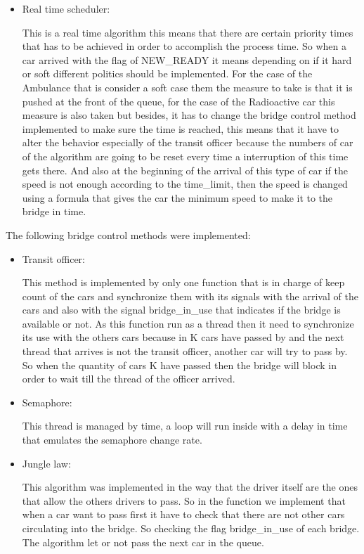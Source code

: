 \documentclass[a4paper,9pt]{article}
\begin{document}
\begin{itemize}
\begin{itemize}
\item Real time scheduler:

This is a real time algorithm this means that there are certain priority times that has to be achieved in order to accomplish the process time. So when a car arrived with the flag of NEW\_READY it means depending on if it hard or soft different politics should be implemented. For the case of the Ambulance  that is consider a soft case them the measure to take is that it is pushed at the front of the queue, for the case of the Radioactive car this measure is also taken but besides, it has to change the bridge control method implemented to make sure the time is reached, this means that it have to alter the behavior especially of the transit officer because the numbers of car of the algorithm are going to be reset every time	a interruption of this time gets there. And also at the beginning of the arrival of this type of car if the speed is not enough according to the time\_limit, then the speed is changed using a formula that gives the car the minimum speed to make it to the bridge in time.  


\end{itemize}
The following bridge control methods were implemented:
\begin{itemize}
\item Transit officer:

This method is implemented by only one function that is in charge of keep count of the cars and synchronize them with its signals with the arrival of the cars and also with the signal bridge\_in\_use that indicates if the bridge is available or not. As this function run as a thread then it need to synchronize its use with the others cars because in K cars have passed by and the next thread that arrives is not the transit officer, another car will try to pass by. So when the quantity of cars K have passed then the bridge will block in order to wait till the thread of the officer arrived.

\item Semaphore: 

This thread is managed by time, a loop will run inside with a delay in time that emulates the semaphore change rate.

\item Jungle law:

This algorithm was implemented in the way that the driver itself are the ones that allow the others drivers to pass. So in the function we implement that when a car want to pass first it have to check that there are not other cars circulating into the bridge. So checking the flag bridge\_in\_use of each bridge. The algorithm let or not pass the next car in the queue. 


\end{itemize}
\end{itemize}
\end{document}
